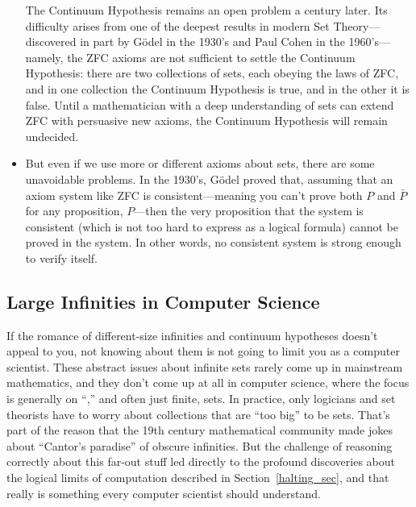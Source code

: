 \begin{itemize}
  The Continuum Hypothesis remains an open problem a century later.
  Its difficulty arises from one of the deepest results in modern Set
  Theory---discovered in part by G\"odel in the 1930's and Paul
  Cohen in the 1960's---namely, the ZFC axioms are not
  sufficient to settle the Continuum Hypothesis: there are two
  collections of sets, each obeying the laws of
  ZFC, and in one collection the
  Continuum Hypothesis is true, and in the other it is false.  Until a
  mathematician with a deep understanding of sets can extend ZFC with
  persuasive new axioms, the Continuum Hypothesis will remain
  undecided.  \iffalse So settling the Continuum Hypothesis some new
  understanding of what Sets should be to arrive at persuasive new
  axioms that extend ZFC and are strong enough to determine the truth
  of the Continuum Hypothesis one way or the other.  \fi
\item But even if we use more or different axioms about sets, there
  are some unavoidable problems.  In the 1930's, G\"odel%
 proved that, assuming that an axiom system like ZFC is
  consistent---meaning you can't prove both $P$ and $\bar{P}$ for any
  proposition, $P$---then the very proposition that the system is
  consistent (which is not too hard to express as a logical formula)
  cannot be proved in the system.  In other words, no consistent
  system is strong enough to verify itself.
  
\end{itemize}

\subsection{Large Infinities in Computer Science}

If the romance of different-size infinities and continuum hypotheses
doesn't appeal to you, not knowing about them is not going to limit
you as a computer scientist.  These abstract issues about infinite
sets rarely come up in mainstream mathematics, and they don't come up
at all in computer science, where the focus is generally on
``,'' and often just finite, sets.  In practice, only
logicians and set theorists have to worry about collections that are
``too big'' to be sets.  That's part of the reason that the 19th
century mathematical community made jokes about ``Cantor's
  paradise'' of obscure infinities.  But the challenge of
reasoning correctly about this far-out stuff led directly to the
profound discoveries about the logical limits of computation described
in Section~\ref{halting_sec}, and that really is something every
computer scientist should understand.

\begin{problems}
\homeworkproblems
{}
\end{problems}
\endinput
